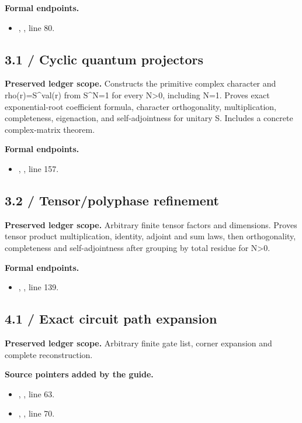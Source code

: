 \textbf{Formal endpoints.}\begin{itemize}
\item {}, , line 80.
\end{itemize}
\subsection{3.1 / Cyclic quantum projectors}
\label{result:3.1}
\textbf{Preserved ledger scope.} Constructs the primitive complex character and rho(r)=S\textasciicircum{}val(r) from S\textasciicircum{}N=1 for every N>0, including N=1. Proves exact exponential-root coefficient formula, character orthogonality, multiplication, completeness, eigenaction, and self-adjointness for unitary S. Includes a concrete complex-matrix theorem.

\textbf{Formal endpoints.}\begin{itemize}
\item {}, , line 157.
\end{itemize}
\subsection{3.2 / Tensor/polyphase refinement}
\label{result:3.2}
\textbf{Preserved ledger scope.} Arbitrary finite tensor factors and dimensions. Proves tensor product multiplication, identity, adjoint and sum laws, then orthogonality, completeness and self-adjointness after grouping by total residue for N>0.

\textbf{Formal endpoints.}\begin{itemize}
\item {}, , line 139.
\end{itemize}
\subsection{4.1 / Exact circuit path expansion}
\label{result:4.1}
\textbf{Preserved ledger scope.} Arbitrary finite gate list, corner expansion and complete reconstruction.

\textbf{Source pointers added by the guide.}\begin{itemize}
\item {}, , line 63.
\item {}, , line 70.
\end{itemize}
